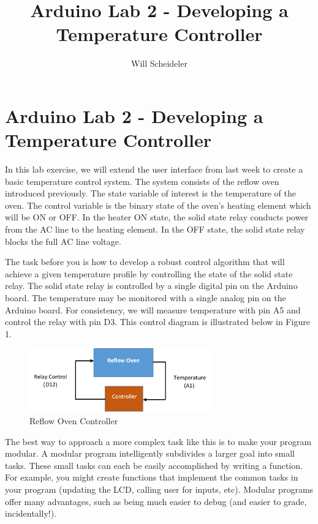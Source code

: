 \documentclass[10pt]{report}
\title{Arduino Lab 2 - Developing a Temperature Controller}
\author{Will Scheideler}
\begin{document}
\section*{Arduino Lab 2 - Developing a Temperature Controller}

\par
In this lab exercise, we will extend the user interface from last week to create a basic temperature control system. The system consists of the reflow oven introduced previously. The state variable of interest is the temperature of the oven. The control variable is the binary state of the oven’s heating element which will be ON or OFF. In the heater ON state, the solid state relay conducts power from the AC line to the heating element. In the OFF state, the solid state relay blocks the full AC line voltage. 

\par
\indent
The task before you is how to develop a robust control algorithm that will achieve a given temperature profile by controlling the state of the solid state relay. The solid state relay is controlled by a single digital pin on the Arduino board. The temperature may be monitored with a single analog pin on the Arduino board. For consistency, we will measure temperature with pin A5 and control the relay with pin D3. This control diagram is illustrated below in Figure 1.

\begin{figure}[H]
\centering
   \includegraphics[width=0.7\textwidth]{fig1.png}
    \caption{Reflow Oven Controller}
\end{figure}

\par The best way to approach a more complex task like this is to make your program modular. A modular program intelligently subdivides a larger goal into small tasks. These small tasks can each be easily accomplished by writing a function. For example, you might create functions that implement the common tasks in your program (updating the LCD, calling user for inputs, etc). Modular programs offer many advantages, such as being much easier to debug (and easier to grade, incidentally!). 
\end{document}
